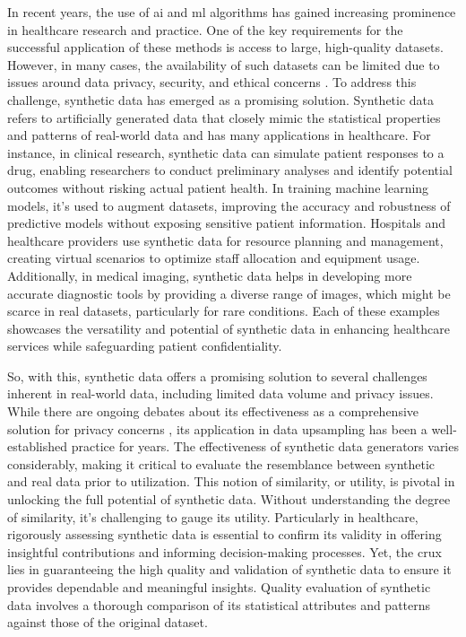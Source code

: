 
In recent years, the use of  \ac{ai} and \ac{ml} algorithms has gained increasing prominence in healthcare research and practice. One of the key requirements for the successful application of these methods is access to large, high-quality datasets. However, in many cases, the availability of such datasets can be limited due to issues around data privacy, security, and ethical concerns \cite{chingOpportunitiesObstaclesDeep2018a}. To address this challenge, synthetic data has emerged as a promising solution. Synthetic data refers to artificially generated data that closely mimic the statistical properties and patterns of real-world data \cite{mullerEvaluationSyntheticElectronic2022} and has many applications in healthcare.
For instance, in clinical research, synthetic data can simulate patient responses to a drug, enabling researchers to conduct preliminary analyses and identify potential outcomes without risking actual patient health. In training machine learning models, it's used to augment datasets, improving the accuracy and robustness of predictive models without exposing sensitive patient information. Hospitals and healthcare providers use synthetic data for resource planning and management, creating virtual scenarios to optimize staff allocation and equipment usage. Additionally, in medical imaging, synthetic data helps in developing more accurate diagnostic tools by providing a diverse range of images, which might be scarce in real datasets, particularly for rare conditions. Each of these examples showcases the versatility and potential of synthetic data in enhancing healthcare services while safeguarding patient confidentiality.

So, with this, synthetic data offers a promising solution to several challenges inherent in real-world data, including limited data volume and privacy issues. While there are ongoing debates about its effectiveness as a comprehensive solution for privacy concerns \cite{stadlerSyntheticDataPrivacy2020}, its application in data upsampling has been a well-established practice for years. The effectiveness of synthetic data generators varies considerably, making it critical to evaluate the resemblance between synthetic and real data prior to utilization. This notion of similarity, or utility, is pivotal in unlocking the full potential of synthetic data. Without understanding the degree of similarity, it's challenging to gauge its utility. Particularly in healthcare, rigorously assessing synthetic data is essential to confirm its validity in offering insightful contributions and informing decision-making processes. %
Yet, the crux lies in guaranteeing the high quality and validation of synthetic data to ensure it provides dependable and meaningful insights. Quality evaluation of synthetic data involves a thorough comparison of its statistical attributes and patterns against those of the original dataset. 

